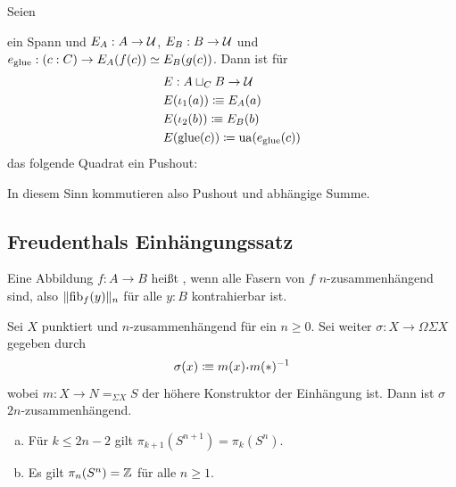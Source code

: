\begin{korollar}
  \label{pushout-descent}
  Seien
  ein Spann und \(E_A:A\to \mathcal{U}\), \(E_B:B\to \mathcal{U}\) und \(e_{\mathrm{glue}}:(c:C)\to E_A(f(c))\simeq E_B(g(c))\).
  Dann ist für
    \begin{align*}
      &E:A\sqcup_C B\to \mathcal{U} \\
      &E(\iota_1(a))\vcentcolon\mspace{-1.2mu}\equiv E_A(a) \\
      &E(\iota_2(b))\vcentcolon\mspace{-1.2mu}\equiv E_B(b)\\
      &E(\mathrm{glue}(c))\coloneq \mathrm{ua}(e_{\mathrm{glue}}(c))
    \end{align*}
    das folgende Quadrat ein Pushout:
    \begin{center}
    \end{center}
    In diesem Sinn kommutieren also Pushout und abhängige Summe.
\end{korollar}

\subsection{Freudenthals Einhängungssatz}

\begin{definition}
  Eine Abbildung \(f:A\to B\) heißt ,
  wenn alle Fasern von \(f\) \(n\)-zusammenhängend sind, also \(\|\mathrm{fib}_f(y)\|_{n}\)
  für alle \(y:B\) kontrahierbar ist.
\end{definition}

\begin{satz}
  \label{freudenthal}
  Sei \(X\) punktiert und \(n\)-zusammenhängend für ein \(n\geq 0\).
  Sei weiter \(\sigma:X\to\Omega\Sigma X\) gegeben durch
  \[
    \sigma(x)\colonequiv m(x)\kon m(\ast)^{-1}
  \]
  wobei \(m:X\to N=_{\Sigma X}S\) der höhere Konstruktor der Einhängung ist.
  Dann ist \(\sigma\) \(2n\)-zusammenhängend.
\end{satz}

\begin{korollar}
  \begin{enumerate}[(a)]
  \item Für \(k\leq 2n-2\) gilt \(\pi_{k+1}(S^{n+1})=\pi_k(S^n)\).
  \item Es gilt \(\pi_n(S^n)=\mathbb{Z}\) für alle \(n\geq 1\).
  \end{enumerate}
\end{korollar}

